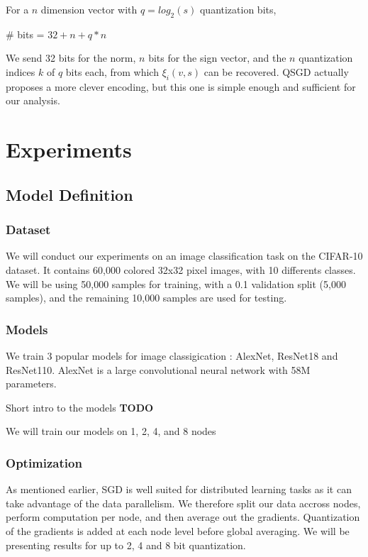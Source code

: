 \documentclass[10pt,conference,compsocconf]{IEEEtran}
\begin{document}
\noindent For a $n$ dimension vector with $q = log_2(s)$ quantization bits,

\begin{center}
 \# bits = $32 + n + q * n$
\end{center}

We send 32 bits for the norm, $n$ bits for the sign vector, and the $n$ quantization indices $k$ of $q$ bits each, from which $\xi_i(v, s)$ can be recovered. QSGD actually proposes a more clever encoding, but this one is simple enough and sufficient for our analysis.

\section{Experiments}

\subsection{Model Definition}

\subsubsection{Dataset}

We will conduct our experiments on an image classification task on the CIFAR-10 dataset. It contains 60,000 colored 32x32 pixel images, with 10 differents classes. We will be using 50,000 samples for training, with a 0.1 validation split (5,000 samples), and the remaining 10,000 samples are used for testing.

\subsubsection{Models}

We train 3 popular models for image classigication : AlexNet, ResNet18 and ResNet110. AlexNet is a large convolutional neural network with 58M parameters.

Short intro to the models \textbf{TODO}

We will train our models on 1, 2, 4, and 8 nodes

\subsubsection{Optimization}

As mentioned earlier, SGD is well suited for distributed learning tasks as it can take advantage of the data parallelism. We therefore split our data accross nodes, perform computation per node, and then average out the gradients. Quantization of the gradients is added at each node level before global averaging. We will be presenting results for up to 2, 4 and 8 bit quantization.
\end{document}

